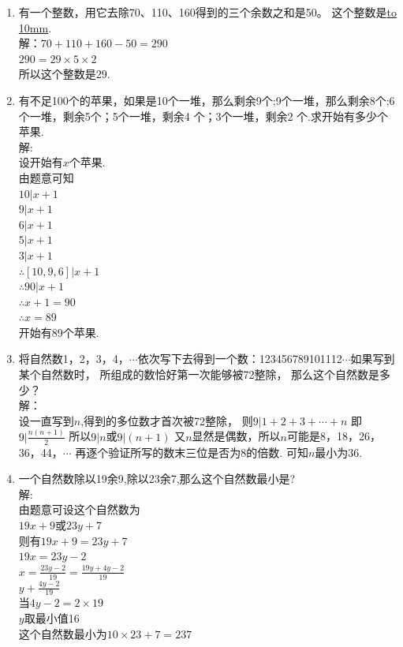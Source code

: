 \documentclass[12pt,oneside,a4paper]{ctexbook} %
\numberwithin{chapter}{part}
\begin{document}
\begin{enumerate}
\item 
有一个整数，用它去除70、110、160得到的三个余数之和是50。 这个整数是\underline{\hbox to 10mm{}}.\\
解：$70+110+160-50=290$\\
$290=29\times5\times2$\\
所以这个整数是29.

\item 
有不足100个的苹果，如果是10个一堆，那么剩余9个;9个一堆，那么剩余8个;6 个一堆，剩余5个；5个一堆，剩余4 个；3个一堆，剩余2 个.求开始有多少个苹果.\\
解:\\
设开始有$x$个苹果.\\
由题意可知\\
$10|x+1$\\
$9|x+1$\\
$6|x+1$\\
$5|x+1$\\
$3|x+1$\\
$\therefore [10,9,6]|x+1$\\
$\therefore 90|x+1$\\
$\therefore x+1=90$\\
$\therefore x=89$\\
开始有89个苹果.

\item 
将自然数1，2，3，4，$\cdots$依次写下去得到一个数：123456789101112$\cdots$如果写到某个自然数时，
所组成的数恰好第一次能够被72整除，
那么这个自然数是多少？\\
解：\\
设一直写到$n$,得到的多位数才首次被72整除，
则$9|1+2+3+\cdots+n$
即$9|\frac{n(n+1)}{2}$
所以$9|n$或$9|(n+1)$
又$n$显然是偶数，所以$n$可能是8，18，26，36，44，$\cdots$
再逐个验证所写的数末三位是否为8的倍数.
可知$n$最小为36.

\item 
一个自然数除以19余9,除以23余7,那么这个自然数最小是?\\
解:\\
由题意可设这个自然数为\\
$19x+9$或$23y+7$\\
则有$19x+9=23y+7$\\
$19x=23y-2$\\
$x=\frac{23y-2}{19}=\frac{19y+4y-2}{19}$\\
$y+\frac{4y-2}{19}$\\
当$4y-2=2\times19$\\
$y$取最小值16\\
这个自然数最小为$10\times23+7=237$


\end{enumerate}
\end{document}

